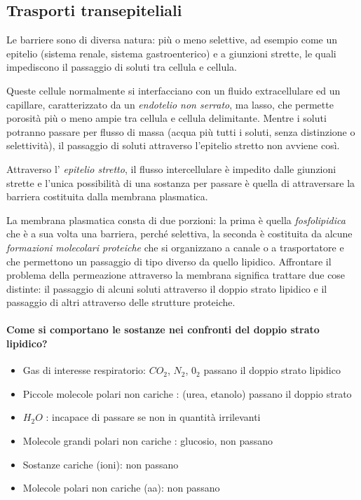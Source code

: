 \documentclass[a4paper,12pt]{article}
\begin{document}
\subsection{Trasporti transepiteliali}
Le barriere sono di diversa natura: più o meno selettive, ad esempio come un epitelio (sistema renale, sistema gastroenterico) e a giunzioni strette, le quali impediscono il passaggio di soluti tra cellula e cellula.

Queste cellule normalmente si interfacciano con un fluido extracellulare ed un capillare, caratterizzato da un \emph{endotelio non serrato}, ma lasso, che permette porosità più o meno ampie tra cellula e cellula delimitante. Mentre i soluti potranno passare per flusso di massa (acqua più tutti i soluti, senza distinzione o selettività), il passaggio di soluti attraverso l’epitelio stretto non avviene così.

Attraverso l'  \emph{epitelio stretto}, il flusso intercellulare è impedito dalle giunzioni strette e l’unica possibilità di una sostanza per passare è quella di attraversare la barriera costituita dalla membrana plasmatica.

La membrana plasmatica consta di due porzioni: la prima è quella \emph{fosfolipidica} che è a sua volta una barriera, perché selettiva, la seconda è costituita da alcune \emph{formazioni molecolari proteiche} che si organizzano a canale o a trasportatore e che permettono un passaggio di tipo diverso da quello lipidico.
Affrontare il problema della permeazione attraverso la membrana significa trattare due cose distinte: il passaggio di alcuni soluti attraverso il doppio strato lipidico e il passaggio di altri attraverso delle strutture proteiche.


\paragraph{Come si comportano le sostanze nei confronti del doppio strato lipidico?}
\begin{itemize}
\item{Gas di interesse respiratorio: $CO_{2}$, $N_{2}$, $0_{2}$ passano il doppio strato lipidico}
\item{Piccole molecole polari non cariche : (urea, etanolo) passano il doppio strato}
\item{$H_{2}O$ : incapace di passare se non in quantità irrilevanti}
\item{Molecole grandi polari non cariche : glucosio, non passano}
\item{Sostanze cariche (ioni): non passano}
\item{Molecole polari non cariche (aa): non passano}
\end{itemize}
\end{document}
